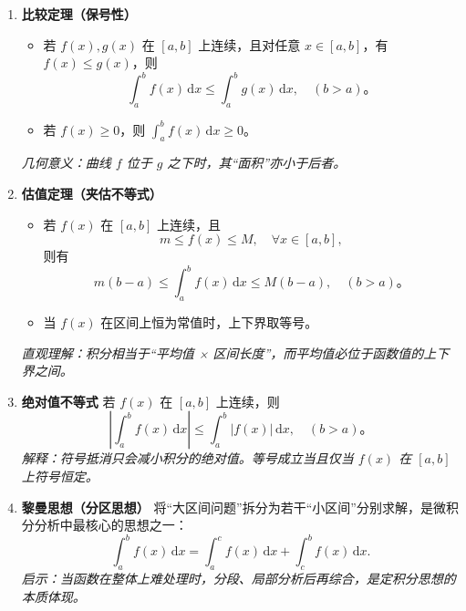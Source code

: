 \begin{enumerate}
    \item \textbf{比较定理（保号性）}
          \begin{itemize}
              \item 若 $f(x),g(x)$ 在 $[a,b]$ 上连续，且对任意 $x\in[a,b]$，有 $f(x)\le g(x)$，则
                    $$
                        \int_{a}^{b}f(x)\,\mathrm{d}x\le\int_{a}^{b}g(x)\,\mathrm{d}x,\quad (b>a)。
                    $$
              \item 若 $f(x)\ge0$，则 $\displaystyle \int_{a}^{b}f(x)\,\mathrm{d}x\ge0$。
          \end{itemize}
          \textit{几何意义：曲线 $f$ 位于 $g$ 之下时，其“面积”亦小于后者。}

    \item \textbf{估值定理（夹估不等式）}
          \begin{itemize}
              \item 若 $f(x)$ 在 $[a,b]$ 上连续，且
                    $$
                        m\le f(x)\le M,\quad \forall x\in[a,b],
                    $$
                    则有
                    $$
                        m(b-a)\le\int_{a}^{b}f(x)\,\mathrm{d}x\le M(b-a),\quad (b>a)。
                    $$
              \item 当 $f(x)$ 在区间上恒为常值时，上下界取等号。
          \end{itemize}
          \textit{直观理解：积分相当于“平均值 × 区间长度”，而平均值必位于函数值的上下界之间。}

    \item \textbf{绝对值不等式}
          若 $f(x)$ 在 $[a,b]$ 上连续，则
          $$
              \left|\int_{a}^{b}f(x)\,\mathrm{d}x\right|
              \le\int_{a}^{b}|f(x)|\,\mathrm{d}x,\quad (b>a)。
          $$
          \textit{解释：符号抵消只会减小积分的绝对值。等号成立当且仅当 $f(x)$ 在 $[a,b]$ 上符号恒定。}

    \item \textbf{黎曼思想（分区思想）}
          将“大区间问题”拆分为若干“小区间”分别求解，是微积分分析中最核心的思想之一：
          $$
              \int_{a}^{b}f(x)\,\mathrm{d}x
              =\int_{a}^{c}f(x)\,\mathrm{d}x+\int_{c}^{b}f(x)\,\mathrm{d}x.
          $$
          \textit{启示：当函数在整体上难处理时，分段、局部分析后再综合，是定积分思想的本质体现。}
\end{enumerate}